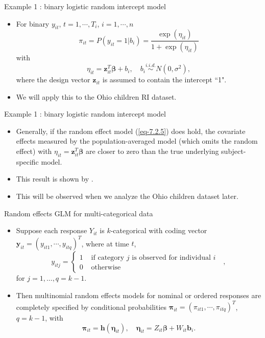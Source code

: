 \documentclass{beamer}
\newcommand{\boldbeta}{{\boldsymbol \beta}}
\newcommand{\boldeta}{{\boldsymbol \eta}}
\newcommand{\boldpi}{{\boldsymbol \pi}}
\newenvironment{wideitemize}%
  {\begin{itemize}%
    \setlength{\parskip}{1em}}%
  {\end{itemize}}
\begin{document}
\begin{frame}{Example 1 : binary logistic random intercept model}

\begin{itemize}
\item
For binary  $y_{it}$, $t=1,\cdots, T_i$, $i=1,\cdots,n$
\begin{equation}
\pi_{it}=P(y_{it}=1|b_i)=\frac{\exp (\eta_{it})}{1+\exp(\eta_{it})}
\label{eq-7.2.5}
\end{equation}
with 
\[
\eta_{it}=\mathbf{z}_{it}^T\boldbeta+b_i, \quad b_i \stackrel{i.i.d.}{\sim} N(0,\sigma^2),\]
 where the design vector $\mathbf{z}_{it}$ is assumed to contain the intercept  ``1".
\vspace{6pt}

\item We will apply this  to the Ohio children RI dataset. 

\end{itemize}
\end{frame}


\begin{frame}{Example 1 : binary logistic random intercept model}
\begin{wideitemize}

\item 
Generally, if the random effect model (\ref{eq-7.2.5}) does hold, the covariate effects measured by the population-averaged model (which omits the random effect) with
$\eta_{it}=\mathbf{z}_{it}^T\boldbeta$ are closer to zero than the true underlying subject-specific
model. 

\item This result is shown by  \cite{NKH1991}.

\item This will be observed when we analyze the Ohio children dataset later. 
\end{wideitemize}
\end{frame}

\begin{frame}{Random effects GLM for multi-categorical data}
\begin{wideitemize}
\item
Suppose each response $Y_{it}$ is $k$-categorical with coding vector $\mathbf{y}_{it}=(y_{it1},\cdots, y_{itq})^T$, where
at time $t$,
\[
y_{itj} = \begin{cases}
1  & \text{ if category $j$ is observed for individual $i$ } \\
0 &\text{ otherwise }
\end{cases},  
\]
for $j = 1, \dots, q = k-1$.
\item
Then multinomial random effects models for nominal or ordered responses are completely specified by conditional
probabilities $\boldpi_{it}=(\pi_{it1}, \cdots, \pi_{itq})^T$, $q=k-1$, with
\[
\boldpi_{it}=\mathbf{h}(\boldeta_{it}), \quad 
\boldeta_{it}=Z_{it}\boldbeta+W_{it}\mathbf{b}_i.
\]
\end{wideitemize}
\end{frame}
\end{document}
